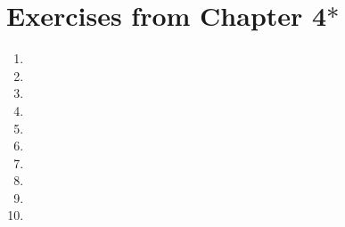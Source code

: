 
\section{Exercises from Chapter 4$\ast$}
\begin{enumerate}
    \item 
    \item
    \item
    \item
    \item
    \item
    \item
    \item
    \item
    \item
\end{enumerate}